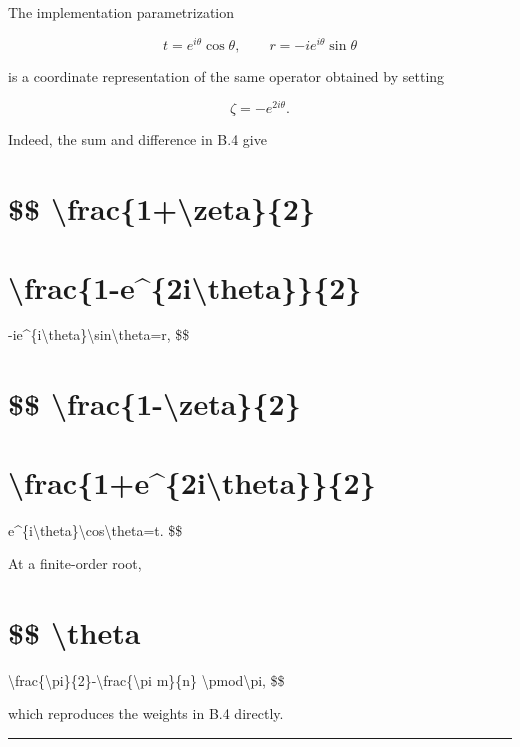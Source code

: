 \documentclass[
  a4paper,
  10pt]{article}
\begin{document}
The implementation parametrization

\[
t=e^{i\theta}\cos\theta,
\qquad
r=-ie^{i\theta}\sin\theta
\]

is a coordinate representation of the same operator obtained by setting

\[
\zeta=-e^{2i\theta}.
\]

Indeed, the sum and difference in B.4 give

\section{\$\$
\textbackslash frac\{1+\textbackslash zeta\}\{2\}}\label{-frac1zeta2}

\section{\textbackslash frac\{1-e\^{}\{2i\textbackslash theta\}\}\{2\}}\label{frac1-e2itheta2}

-ie\^{}\{i\textbackslash theta\}\textbackslash sin\textbackslash theta=r,
\$\$

\section{\$\$
\textbackslash frac\{1-\textbackslash zeta\}\{2\}}\label{-frac1-zeta2}

\section{\textbackslash frac\{1+e\^{}\{2i\textbackslash theta\}\}\{2\}}\label{frac1e2itheta2}

e\^{}\{i\textbackslash theta\}\textbackslash cos\textbackslash theta=t.
\$\$

At a finite-order root,

\section{\$\$ \textbackslash theta}\label{-theta-1}

\textbackslash frac\{\textbackslash pi\}\{2\}-\textbackslash frac\{\textbackslash pi
m\}\{n\} \textbackslash pmod\textbackslash pi, \$\$

which reproduces the weights in B.4 directly.

\begin{center}\rule{0.5\linewidth}{0.5pt}\end{center}
\end{document}
